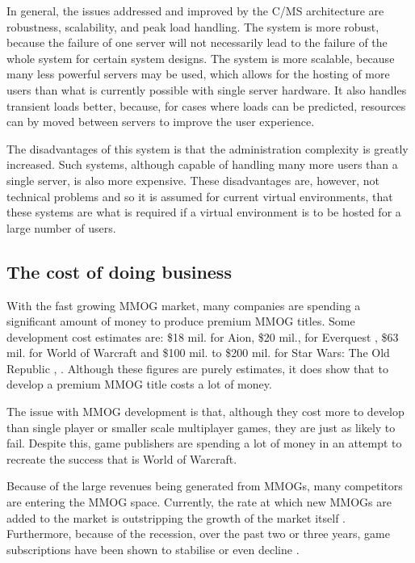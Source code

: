 In general, the issues addressed and improved by the C/MS architecture are robustness, scalability, and peak load handling. The system is more robust, because the failure of one server will not necessarily lead to the failure of the whole system for certain system designs. The system is more scalable, because many less powerful servers may be used, which allows for the hosting of more users than what is currently possible with single server hardware. It also handles transient loads better, because, for cases where loads can be predicted, resources can by moved between servers to improve the user experience.

The disadvantages of this system is that the administration complexity is greatly increased. Such systems, although capable of handling many more users than a single server, is also more expensive. These disadvantages are, however, not technical problems and so it is assumed for current virtual environments, that these systems are what is required if a virtual environment is to be hosted for a large number of users.

\subsection{The cost of doing business}
\label{mmog_cost}

With the fast growing MMOG market, many companies are spending a significant amount of money to produce premium MMOG titles. Some development cost estimates are: \$18 mil. for Aion, \$20 mil., for Everquest \cite{aion_everquest_cost}, \$63 mil. for World of Warcraft \cite{wow_cost} and \$100 mil. to \$200 mil. for Star Wars: The Old Republic \cite{star_wars_cost_1}, \cite{star_wars_cost_2}. Although these figures are purely estimates, it does show that to develop a premium MMOG title costs a lot of money.

The issue with MMOG development is that, although they cost more to develop than single player or smaller scale multiplayer games, they are just as likely to fail. Despite this, game publishers are spending a lot of money in an attempt to recreate the success that is World of Warcraft.

Because of the large revenues being generated from MMOGs, many competitors are entering the MMOG space. Currently, the rate at which new MMOGs are added to the market is outstripping the growth of the market itself \cite{newzoo_mmo_report}. Furthermore, because of the recession, over the past two or three years, game subscriptions have been shown to stabilise or even decline \cite{mmo_growth_chart}.

